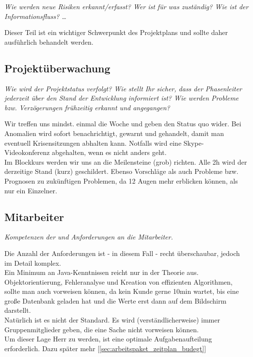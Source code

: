 \documentclass[fontsize=12pt,paper=a4,twoside]{scrartcl}
\begin{document}
{\em Wie werden neue Risiken erkannt/erfasst? Wer ist für was
  zuständig? Wie ist der Informationsfluss? \ldots 

Dieser Teil ist ein
  wichtiger Schwerpunkt des Projektplans und sollte daher ausführlich
  behandelt werden.}

\subsection{Projektüberwachung}\label{3.4-controlling}
{\em Wie wird der Projektstatus verfolgt? Wie stellt Ihr sicher, dass
  der Phasenleiter jederzeit über den Stand der Entwicklung informiert
  ist? Wie werden Probleme bzw. Verzögerungen frühzeitig erkannt und
  angegangen?}

Wir treffen uns mindst. einmal die Woche und geben den Status quo wider. Bei Anomalien wird sofort benachrichtigt, gewarnt und gehandelt, damit man eventuell Krisensitzungen abhalten kann. Notfalls wird eine Skype-Videokonferenz abgehalten, wenn es nicht anders geht.\\
Im Blockkurs werden wir uns an die Meilensteine (grob) richten. Alle 2h wird der derzeitige Stand (kurz) geschildert. Ebenso Vorschläge als auch Probleme bzw. Prognosen zu zukünftigen Problemen, da 12 Augen mehr erblicken können, als nur ein Einzelner.\\ 

\subsection{Mitarbeiter}
{\em Kompetenzen der und Anforderungen an die Mitarbeiter.}

Die Anzahl der Anforderungen ist - in diesem Fall - recht überschaubar, jedoch im Detail komplex.\\
Ein Minimum an Java-Kenntnissen reicht nur in der Theorie aus. Objektorientierung, Fehleranalyse und Kreation von effizienten Algorithmen, sollte man auch vorweisen können, da kein Kunde gerne 10min wartet, bis eine große Datenbank geladen hat und die Werte erst dann auf dem Bildschirm darstellt.\\
Natürlich ist es nicht der Standard. Es wird (verständlicherweise) immer Gruppenmitglieder geben, die eine Sache nicht vorweisen können.\\
Um dieser Lage Herr zu werden, ist eine optimale Aufgabenaufteilung erforderlich. Dazu später mehr [\ref{sec:arbeitspaket_zeitplan_budegt}]\\
\end{document}
